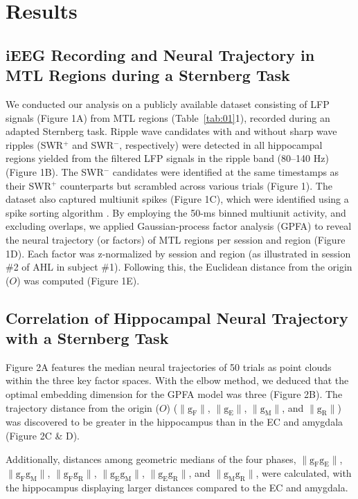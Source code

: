 \section{Results}
\subsection{iEEG Recording and Neural Trajectory in MTL Regions during a Sternberg Task}
We conducted our analysis on a publicly available dataset \cite{boran_dataset_2020} consisting of LFP signals (Figure 1A) from MTL regions (Table~\ref{tab:01}1), recorded during an adapted Sternberg task. Ripple wave candidates with and without sharp wave ripples (SWR$^+$ and SWR$^-$, respectively) were detected in all hippocampal regions yielded from the filtered LFP signals in the ripple band (80--140 Hz) (Figure 1B). The SWR$^-$ candidates were identified at the same timestamps as their SWR$^+$ counterparts but scrambled across various trials (Figure 1). The dataset also captured multiunit spikes (Figure 1C), which were identified using a spike sorting algorithm \cite{niediek_reliable_2016}. By employing the 50-ms binned multiunit activity, and excluding overlaps, we applied Gaussian-process factor analysis (GPFA) \cite{yu_gaussian-process_2009} to reveal the neural trajectory (or factors) of MTL regions per session and region (Figure 1D). Each factor was z-normalized by session and region (as illustrated in session \#2 of AHL in subject \#1). Following this, the Euclidean distance from the origin ($O$) was computed (Figure 1E).

\subsection{Correlation of Hippocampal Neural Trajectory with a Sternberg Task}
Figure 2A features the median neural trajectories of 50 trials as point clouds within the three key factor spaces. With the elbow method, we deduced that the optimal embedding dimension for the GPFA model was three (Figure 2B). The trajectory distance from the origin ($O$) ($\mathrm{\lVert g_{F} \rVert}$, $\mathrm{\lVert g_{E} \rVert}$, $\mathrm{\lVert g_{M} \rVert}$, and $\mathrm{\lVert g_{R} \rVert}$) was discovered to be greater in the hippocampus than in the EC and amygdala (Figure 2C \& D).

Additionally, distances among geometric medians of the four phases, $\mathrm{\lVert g_{F}g_{E} \rVert}$, $\mathrm{\lVert g_{F}g_{M} \rVert}$, $\mathrm{\lVert g_{F}g_{R} \rVert}$, $\mathrm{\lVert g_{E}g_{M} \rVert}$, $\mathrm{\lVert g_{E}g_{R} \rVert}$, and $\mathrm{\lVert g_{M}g_{R} \rVert}$, were calculated, with the hippocampus displaying larger distances compared to the EC and amygdala.

